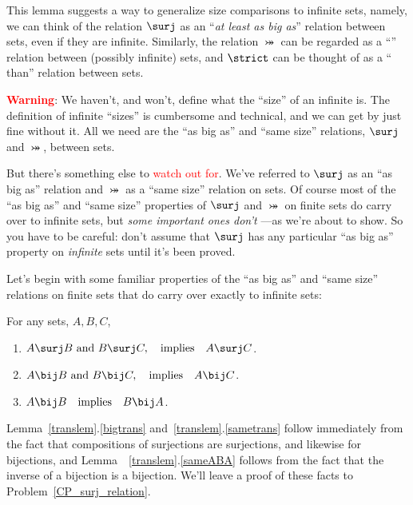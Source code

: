 This lemma suggests a way to generalize size comparisons to infinite sets,
namely, we can think of the relation $\surj$ as an ``\emph{at least as big
  as}'' relation between sets, even if they are infinite.  Similarly, the
relation $\bij$ can be regarded as a ``'' relation between
(possibly infinite) sets, and $\strict$ can be thought of as a
`` than'' relation between sets.

\textcolor{red}{\textbf{Warning}}: We haven't, and won't, define what the
``size'' of an infinite is.  The definition of infinite ``sizes'' is
cumbersome and technical, and we can get by just fine without it.  All we
need are the ``as big as'' and ``same size'' relations, $\surj$ and
$\bij$, between sets.

But there's something else to \textcolor{red}{watch out for}.  We've
referred to $\surj$ as an ``as big as'' relation and $\bij$ as a ``same
size'' relation on sets.  Of course most of the ``as big as'' and ``same
size'' properties of $\surj$ and $\bij$ on finite sets do carry over to
infinite sets, but \emph{some important ones don't} ---as we're about to
show.  So you have to be careful: don't assume that $\surj$ has any
particular ``as big as'' property on \emph{infinite} sets until it's been
proved.

Let's begin with some familiar properties of the ``as big as'' and ``same
size'' relations on finite sets that do carry over exactly to infinite
sets:
\begin{lemma}\label{translem}
For any sets, $A,B,C$,
\begin{enumerate}

\item \label{bigtrans}
$A \surj  B \text{ and } B \surj C, \qimplies  A \surj C$.

\item \label{sametrans} $A \bij B \text{ and } B \bij C, \qimplies A \bij C$.

\item\label{sameABA}
$A \bij B \qimplies B \bij A$.
\end{enumerate}
\end{lemma}

Lemma~\ref{translem}.\ref{bigtrans} and~\ref{translem}.\ref{sametrans}
follow immediately from the fact that compositions of surjections are
surjections, and likewise for bijections, and
Lemma~~\ref{translem}.\ref{sameABA} follows from the fact that the inverse
of a bijection is a bijection.  We'll leave a proof of these facts to
Problem~\ref{CP_surj_relation}.

